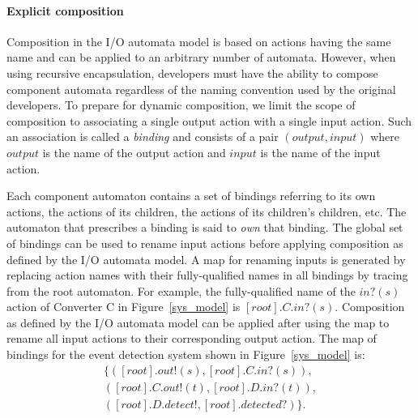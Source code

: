 \paragraph*{Explicit composition}
Composition in the I/O automata model is based on actions having the same name and can be applied to an arbitrary number of automata.
However, when using recursive encapsulation, developers must have the ability to compose component automata regardless of the naming convention used by the original developers.
To prepare for dynamic composition, we limit the scope of composition to associating a single output action with a single input action.
Such an association is called a \emph{binding} and consists of a pair $(output, input)$ where $output$ is the name of the output action and $input$ is the name of the input action.

Each component automaton contains a set of bindings referring to its own actions, the actions of its children, the actions of its children's children, etc.
The automaton that prescribes a binding is said to \emph{own} that binding.
The global set of bindings can be used to rename input actions before applying composition as defined by the I/O automata model.
A map for renaming inputs is generated by replacing action names with their fully-qualified names in all bindings by tracing from the root automaton.
For example, the fully-qualified name of the $in?(s)$ action of Converter C in Figure~\ref{sys_model} is $[root].C.in?(s)$.
Composition as defined by the I/O automata model can be applied after using the map to rename all input actions to their corresponding output action.
The map of bindings for the event detection system shown in Figure~\ref{sys_model} is: 
\begin{displaymath}
\begin{split}
\{ ([root].out!(s), [root].C.in?(s)),\\
   ([root].C.out!(t), [root].D.in?(t)),\\
   ([root].D.detect!, [root].detected?) \}.
\end{split}
\end{displaymath}

